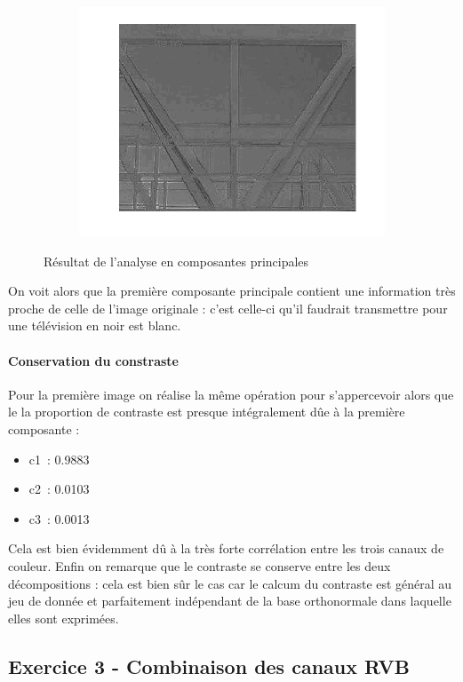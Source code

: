 \documentclass{article}
\begin{document}
\begin{figure}[ht]
\begin{subfigure}[c]{0.32\linewidth}
    	\includegraphics[width=\linewidth]{images/1/1-2-gantrycrane_c3.png}
    \end{subfigure}
    \caption{Résultat de l'analyse en composantes principales}
    \label{acp_gantrycrane}
\end{figure}
On voit alors que la première composante principale contient une information très proche de celle de l'image originale : c'est celle-ci qu'il faudrait transmettre pour une télévision en noir est blanc.
\paragraph{Conservation du constraste}
Pour la première image on réalise la même opération pour s'appercevoir alors que le la proportion de contraste est presque intégralement dûe à la première composante :
\begin{itemize}
	\item c1~: 0.9883
	\item c2~: 0.0103
	\item c3~: 0.0013
\end{itemize}
Cela est bien évidemment dû à la très forte corrélation entre les trois canaux de couleur. Enfin on remarque que le contraste se conserve entre les deux décompositions : cela est bien sûr le cas car le calcum du contraste est général au jeu de donnée et parfaitement indépendant de la base orthonormale dans laquelle elles sont exprimées.

\subsection{Exercice 3 - Combinaison des canaux RVB}
\end{document}
